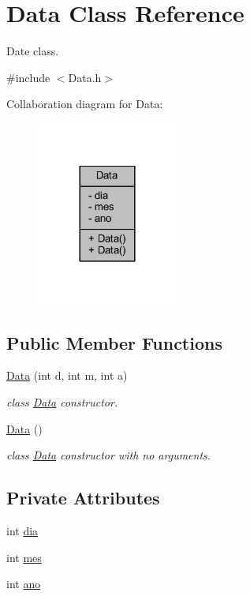 \hypertarget{class_data}{}\section{Data Class Reference}
\label{class_data}


Date class.  




{\ttfamily \#include $<$Data.\+h$>$}



Collaboration diagram for Data\+:\nopagebreak
\begin{figure}[H]
\begin{center}
\leavevmode
\includegraphics[width=132pt]{class_data__coll__graph}
\end{center}
\end{figure}
\subsection*{Public Member Functions}
\begin{DoxyCompactItemize}
\item 
\hyperlink{class_data_ab19ff9142aad6f03e1a8be8284d9e8fa}{Data} (int d, int m, int a)
\begin{DoxyCompactList}\small\item\em class \hyperlink{class_data}{Data} constructor. \end{DoxyCompactList}\item 
\hyperlink{class_data_af11f741cb7f587e2e495452a8905a22a}{Data} ()
\begin{DoxyCompactList}\small\item\em class \hyperlink{class_data}{Data} constructor with no arguments. \end{DoxyCompactList}\end{DoxyCompactItemize}
\subsection*{Private Attributes}
\begin{DoxyCompactItemize}
\item 
int \hyperlink{class_data_ad76270db677fc394a4a7ded1c58de6d5}{dia}
\item 
int \hyperlink{class_data_a8f77c5b515144e08b4fe26a8604f30ad}{mes}
\item 
int \hyperlink{class_data_a80d76fe2225d187fe8a20414478a2cb5}{ano}
\end{DoxyCompactItemize}
